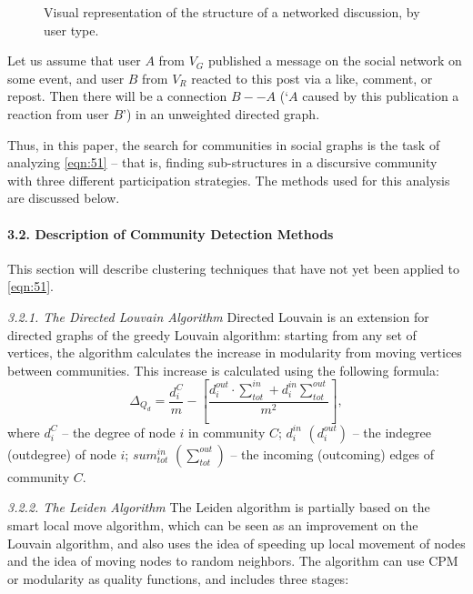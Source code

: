 \begin{figure}[ht]
	\caption{Visual representation of the structure of a networked discussion, by user type.}\label{fig:networkedDiscussionRepresentation}
\end{figure}

Let us assume that user \(A\) from \(V_G\) published a message on the social network on some event, and user \(B\) from \(V_R\) reacted to this post via a like, comment, or repost. Then there will be a connection \(B -- A\) (‘\(A\) caused by this publication a reaction from user \(B\)’) in an unweighted directed graph. 

Thus, in this paper, the search for communities in social graphs is the task of analyzing \cref{eqn:51} -- that is, finding sub-structures in a discursive community with three different participation strategies. The methods used for this analysis are discussed below.

\paragraph{3.2. Description of Community Detection Methods} This section will describe clustering techniques that have not yet been applied to \cref{eqn:51}.

\textit{3.2.1. The Directed Louvain Algorithm} Directed Louvain \cite{DuguePerez} is an extension for directed graphs of the greedy Louvain \cite{BlondelGuillaumeLambiotte} algorithm: starting from any set of vertices, the algorithm calculates the increase in modularity from moving vertices between communities. This increase is calculated using the following formula:
\[
	\Delta_{Q_d} = \frac{d^C_i}{m} - \left[\frac{d^{out}_i \cdot \sum_{tot}^{in} + d^{in}_i \sum_{tot}^{out}}{m^2}\right],
\] where \(d^C_i\) -- the degree of node \(i\) in community \(C\); \(d^{in}_i\) \((d^{out}_i)\) -- the indegree (outdegree) of node \(i\); \(sum^{in}_{tot}\) \((\sum_{tot}^{out})\) -- the incoming (outcoming) edges of community \(C\).

\textit{3.2.2. The Leiden Algorithm} The Leiden \cite{TraagWaltmanVanEck} algorithm is partially based on the smart local move algorithm, which can be seen as an improvement on the Louvain \cite{BlondelGuillaumeLambiotte} algorithm, and also uses the idea of speeding up local movement of nodes and the idea of moving nodes to random neighbors. The algorithm can use CPM or modularity as quality functions, and includes three stages:

